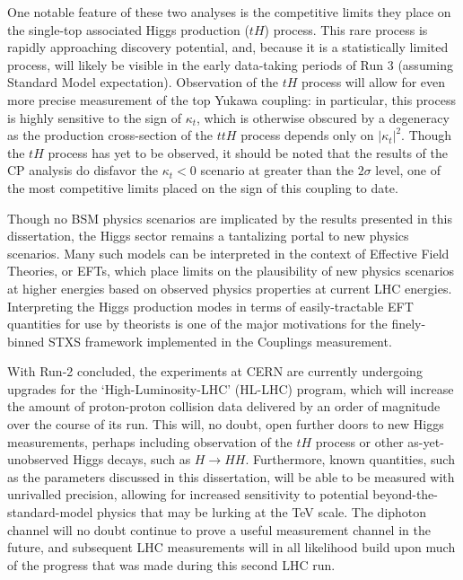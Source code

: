 One notable feature of these two analyses is the competitive limits they place on the single-top associated Higgs production ($tH$) process. This rare process is rapidly approaching discovery potential, and, because it is a statistically limited process, will likely be visible in the early data-taking periods of Run 3 (assuming Standard Model expectation). Observation of the $tH$ process will allow for even more precise measurement of the top Yukawa coupling: in particular, this process is highly sensitive to the sign of $\kappa_{t}$, which is otherwise obscured by a degeneracy as the production cross-section of the $ttH$ process depends only on $|\kappa_{t}|^{2}$. Though the $tH$ process has yet to be observed, it should be noted that the results of the CP analysis do disfavor the $\kappa_{t} < 0$ scenario at greater than the $2 \sigma$ level, one of the most competitive limits placed on the sign of this coupling to date.

Though no BSM physics scenarios are implicated by the results presented in this dissertation, the Higgs sector remains a tantalizing portal to new physics scenarios. Many such models can be interpreted in the context of Effective Field Theories, or EFTs, which place limits on the plausibility of new physics scenarios at higher energies based on observed physics properties at current LHC energies. Interpreting the Higgs production modes in terms of easily-tractable EFT quantities for use by theorists is one of the major motivations for the finely-binned STXS framework implemented in the Couplings measurement.

With Run-2 concluded, the experiments at CERN are currently undergoing upgrades for the `High-Luminosity-LHC' (HL-LHC) program, which will increase the amount of proton-proton collision data delivered by an order of magnitude over the course of its run. This will, no doubt, open further doors to new Higgs measurements, perhaps including observation of the $tH$ process or other as-yet-unobserved Higgs decays, such as $H \rightarrow HH$. Furthermore, known quantities, such as the parameters discussed in this dissertation, will be able to be measured with unrivalled precision, allowing for increased sensitivity to potential beyond-the-standard-model physics that may be lurking at the TeV scale. The diphoton channel will no doubt continue to prove a useful measurement channel in the future, and subsequent LHC measurements will in all likelihood build upon much of the progress that was made during this second LHC run.
